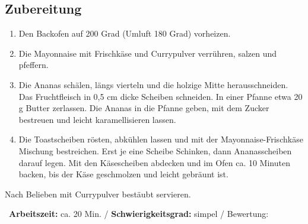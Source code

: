 \begin{minipage}[t]{0.58\textwidth}
\vspace{0pt}
\subsection*{Zubereitung}
\begin{enumerate}[leftmargin=*, itemindent=14pt]

\item Den Backofen auf 200 Grad (Umluft 180 Grad) vorheizen. 

\item Die Mayonnaise mit Frischkäse und Currypulver verrühren, salzen und pfeffern. 

\item Die Ananas schälen, längs vierteln und die holzige Mitte herausschneiden. Das Fruchtfleisch in 0,5 cm dicke Scheiben schneiden. In einer Pfanne etwa 20 g Butter zerlassen. Die Ananas in die Pfanne geben, mit dem Zucker bestreuen und leicht karamellisieren lassen.

\item Die Toastscheiben rösten, abkühlen lassen und mit der Mayonnaise-Frischkäse Mischung bestreichen. Erst je eine Scheibe Schinken, dann Ananasscheiben darauf legen. Mit den Käsescheiben abdecken und im Ofen ca. 10 Minuten backen, bis der Käse geschmolzen und leicht gebräunt ist. 


\end{enumerate}
Nach Belieben mit Currypulver bestäubt servieren.
\end{minipage}
\vfill
\decothreeright \, \textbf{Arbeitszeit:} ca. 20 Min.	 / \textbf{Schwierigkeitsgrad:} simpel	 / \decothreeleft \hfill Bewertung: \Circle  \Circle \Circle  \Circle \Circle